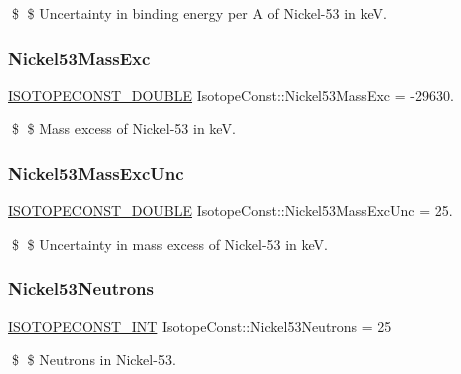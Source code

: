 \$ \$ Uncertainty in binding energy per A of Nickel-\/53 in keV. \mbox{\label{group___isotope_const-_nickel-_ni53_ga825c1bc8edba54a8d75269cd23756699}} 
\subsubsection{\texorpdfstring{Nickel53\+Mass\+Exc}{Nickel53MassExc}}
{\footnotesize\ttfamily \mbox{\hyperlink{group___isotope_const-_macros_ga8f45a7272ce02c0b4c65c44636ed719a}{I\+S\+O\+T\+O\+P\+E\+C\+O\+N\+S\+T\+\_\+\+D\+O\+U\+B\+LE}} Isotope\+Const\+::\+Nickel53\+Mass\+Exc = -\/29630.}

\$ \$ Mass excess of Nickel-\/53 in keV. \mbox{\label{group___isotope_const-_nickel-_ni53_gacf2aa9deb0ed5dddc2246535ce187c2e}} 
\subsubsection{\texorpdfstring{Nickel53\+Mass\+Exc\+Unc}{Nickel53MassExcUnc}}
{\footnotesize\ttfamily \mbox{\hyperlink{group___isotope_const-_macros_ga8f45a7272ce02c0b4c65c44636ed719a}{I\+S\+O\+T\+O\+P\+E\+C\+O\+N\+S\+T\+\_\+\+D\+O\+U\+B\+LE}} Isotope\+Const\+::\+Nickel53\+Mass\+Exc\+Unc = 25.}

\$ \$ Uncertainty in mass excess of Nickel-\/53 in keV. \mbox{\label{group___isotope_const-_nickel-_ni53_ga9a9075238cb50be7455352062ebf2fe3}} 
\subsubsection{\texorpdfstring{Nickel53\+Neutrons}{Nickel53Neutrons}}
{\footnotesize\ttfamily \mbox{\hyperlink{group___isotope_const-_macros_ga5f18360b3e99483a35c32d789e62621c}{I\+S\+O\+T\+O\+P\+E\+C\+O\+N\+S\+T\+\_\+\+I\+NT}} Isotope\+Const\+::\+Nickel53\+Neutrons = 25}

\$ \$ Neutrons in Nickel-\/53. \mbox{\label{group___isotope_const-_nickel-_ni53_gaac51826c05900d9144322167e4ebc2d0}} 
